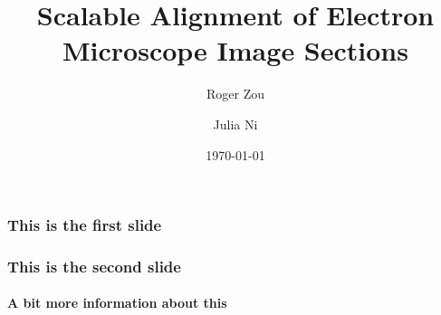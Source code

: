 \documentclass{beamer}
\begin{document}
\title[Scalable EM Alignment] %
{Scalable Alignment of Electron Microscope Image Sections}
\author[Zou, Ni] {Roger Zou \and Julia Ni}
\date{\today}

\frame{\titlepage}

\begin{frame}
\frametitle{This is the first slide}

\end{frame}

\begin{frame}
\frametitle{This is the second slide}
\framesubtitle{A bit more information about this}

\end{frame}
\end{document}
